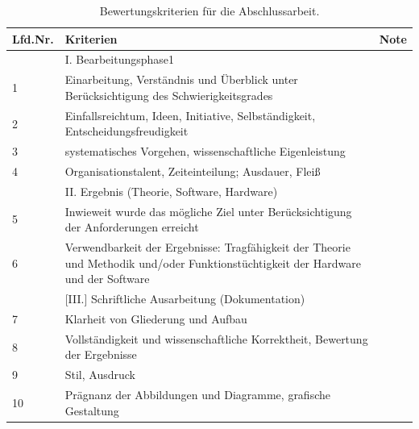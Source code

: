 \begin{table}[!h]
\centering
\begin{tabular}{ |p{1cm}|p{9cm}|p{0.7cm}|  }
\hline
Lfd.Nr. &Kriterien  &Note\\  
\hline
\hline
&I. Bearbeitungsphase1&\\
\hline
1&Einarbeitung, Verständnis und Überblick unter Berücksichtigung des Schwierigkeitsgrades&\\
\hline
2& Einfallsreichtum, Ideen, Initiative, Selbständigkeit, Entscheidungsfreudigkeit&\\
\hline
3& systematisches Vorgehen, wissenschaftliche Eigenleistung&\\
\hline
4&Organisationstalent, Zeiteinteilung; Ausdauer, Fleiß&\\
\hline
& II. Ergebnis (Theorie, Software, Hardware)&\\ 
\hline
5&Inwieweit wurde das mögliche Ziel unter Berücksichtigung der Anforderungen erreicht&\\
\hline
6&Verwendbarkeit der Ergebnisse: Tragfähigkeit der Theorie und Methodik und/oder Funktionstüchtigkeit der Hardware und der Software&\\
\hline
&[III.] Schriftliche Ausarbeitung (Dokumentation)&\\
\hline
7&Klarheit von Gliederung und Aufbau&\\
\hline
8&Vollständigkeit und wissenschaftliche Korrektheit, Bewertung der Ergebnisse&\\
\hline
9&Stil, Ausdruck&\\\hline
10&Prägnanz der Abbildungen und Diagramme, grafische Gestaltung&\\
\hline
\end{tabular}
\caption{Bewertungskriterien für die Abschlussarbeit.}
\label{tab:arbeit}
\end{table}


